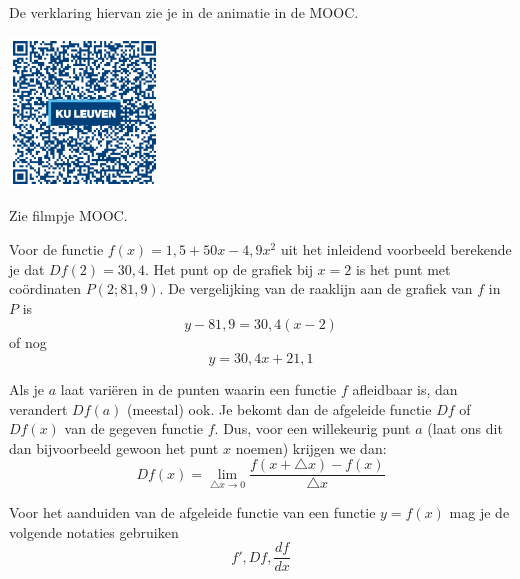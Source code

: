 De verklaring hiervan zie je in de animatie in de MOOC.

\begin{minipage}{.25\linewidth}
	\raggedright
	\includegraphics[width=4cm]{6_afgeleiden_integralen/inputs/QR_Code_AFGANIMATIE_module6_1new}
\end{minipage}
\begin{minipage}{.7\linewidth}
	Zie filmpje MOOC.
\end{minipage}

\begin{voorbeeld}
	Voor de functie $f(x)=1,5+50 x -4,9 x^2$ uit het inleidend voorbeeld berekende je dat $Df(2)=30,4$.
	Het punt op de grafiek bij $x=2$ is het punt met co\"ordinaten $P(2;81,9)$.
	De vergelijking van de raaklijn aan de grafiek van $f$ in $P$ is
	\[
	y-81,9=30,4(x-2)
	\]
	of nog
	\[
	y=30,4x+21,1
	\]
	
	\begin{center}
		
	\end{center}
\end{voorbeeld}\vspace{0,5 cm}

\begin{definitie}
	Als je $a$ laat variëren in de punten waarin een functie
	$f$ afleidbaar is, dan verandert $Df(a)$ (meestal) ook. Je bekomt
	dan de afgeleide functie $Df$ of $Df(x)$ van de gegeven functie
	$f$. Dus, voor een willekeurig punt $a$ (laat ons dit dan bijvoorbeeld
	gewoon het punt $x$ noemen) krijgen we dan:
	\[
	Df(x)={\displaystyle \lim_{\triangle x\to0}}\frac{f(x+\triangle x)-f(x)}{\triangle x}
	\]
\end{definitie}

\begin{notatie}
Voor het aanduiden van de afgeleide functie van een functie $y=f(x)$ mag je de volgende notaties gebruiken
\[f',Df,\frac{df}{dx}\]
\end{notatie}

